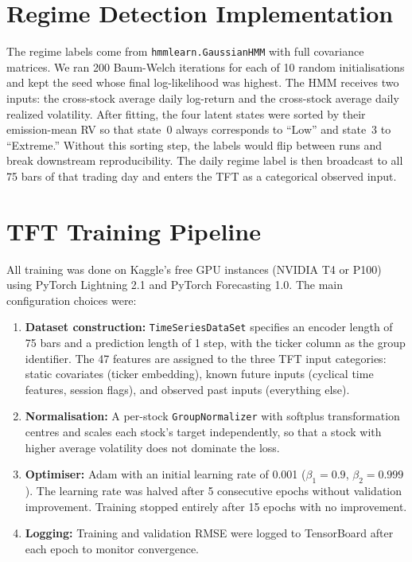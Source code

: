 \section{Regime Detection Implementation}

The regime labels come from \texttt{hmmlearn.GaussianHMM} with full covariance matrices. We ran 200 Baum-Welch iterations for each of 10 random initialisations and kept the seed whose final log-likelihood was highest. The HMM receives two inputs: the cross-stock average daily log-return and the cross-stock average daily realized volatility. After fitting, the four latent states were sorted by their emission-mean RV so that state~0 always corresponds to ``Low'' and state~3 to ``Extreme.'' Without this sorting step, the labels would flip between runs and break downstream reproducibility. The daily regime label is then broadcast to all 75 bars of that trading day and enters the TFT as a categorical observed input.

\section{TFT Training Pipeline}

All training was done on Kaggle's free GPU instances (NVIDIA T4 or P100) using PyTorch Lightning 2.1 and PyTorch Forecasting 1.0. The main configuration choices were:

\begin{enumerate}
\item \textbf{Dataset construction:} \texttt{TimeSeriesDataSet} specifies an encoder length of 75 bars and a prediction length of 1 step, with the ticker column as the group identifier. The 47 features are assigned to the three TFT input categories: static covariates (ticker embedding), known future inputs (cyclical time features, session flags), and observed past inputs (everything else).
\item \textbf{Normalisation:} A per-stock \texttt{GroupNormalizer} with softplus transformation centres and scales each stock's target independently, so that a stock with higher average volatility does not dominate the loss.
\item \textbf{Optimiser:} Adam with an initial learning rate of 0.001 ($\beta_1=0.9$, $\beta_2=0.999$). The learning rate was halved after 5 consecutive epochs without validation improvement. Training stopped entirely after 15 epochs with no improvement.
\item \textbf{Logging:} Training and validation RMSE were logged to TensorBoard after each epoch to monitor convergence.
\end{enumerate}

